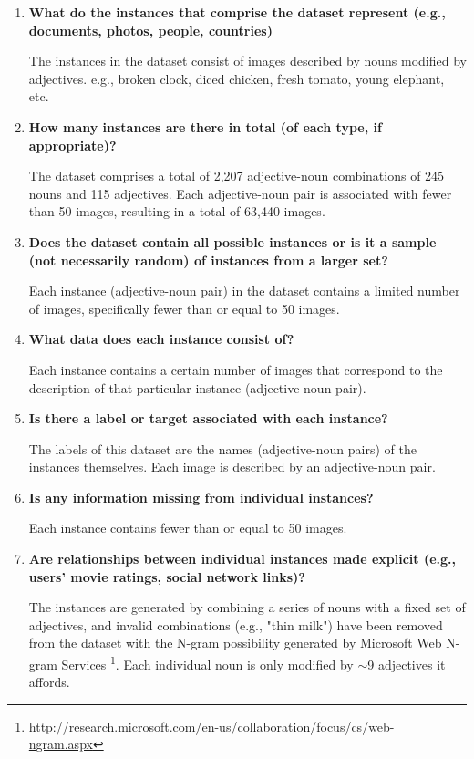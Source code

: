 \documentclass[a4paper,12pt]{article}
\begin{document}
\begin{enumerate}
    \item \textbf{What do the instances that comprise the dataset represent (e.g.,
    documents, photos, people, countries)}

    The instances in the dataset consist of images described by nouns modified by adjectives.
    e.g., broken clock, diced chicken, fresh tomato, young elephant, etc.

    \item \textbf{How many instances are there in total (of each type, if appropriate)?}
    
    
    The dataset comprises a total of 2,207 adjective-noun combinations of 245 nouns and 115 adjectives. 
    Each adjective-noun pair is associated with fewer than 50 images, 
    resulting in a total of 63,440 images.

    \item \textbf{Does the dataset contain all possible instances or is it a sample
    (not necessarily random) of instances from a larger set?}

    
    Each instance (adjective-noun pair) in the dataset contains a limited number of images, 
    specifically fewer than or equal to 50 images.

    \item \textbf{What data does each instance consist of?}
    
    Each instance contains a certain number of images that correspond to the description of that particular instance (adjective-noun pair).

    \item \textbf{Is there a label or target associated with each instance?}
    
    
    The labels of this dataset are the names (adjective-noun pairs) of the instances themselves. Each image is described by an adjective-noun pair.

    \item \textbf{Is any information missing from individual instances?}
    
    Each instance contains fewer than or equal to 50 images.

    \item \textbf{Are relationships between individual instances made explicit
    (e.g., users' movie ratings, social network links)? }

   
    The instances are generated by combining a series of nouns with a fixed set of adjectives, and invalid combinations (e.g., "thin milk") have been removed from the dataset with the N-gram possibility generated by Microsoft Web N-gram Services \footnote{\url{http://research.microsoft.com/en-us/collaboration/focus/cs/web-ngram.aspx}}. Each individual noun is only modified by $\sim$9 adjectives it affords.


\end{enumerate}
\end{document}
